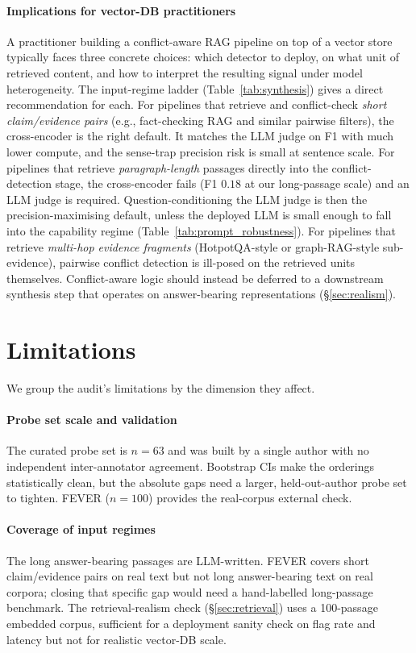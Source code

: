 \documentclass[sigconf, nonacm, natbib]{acmart}
\begin{document}
\paragraph{Implications for vector-DB practitioners}
A practitioner building a conflict-aware RAG pipeline on top of a vector store typically
faces three concrete choices: which detector to deploy, on what unit of retrieved
content, and how to interpret the resulting signal under model heterogeneity. The
input-regime ladder (Table~\ref{tab:synthesis}) gives a direct recommendation for each.
For pipelines that retrieve and conflict-check \emph{short claim/evidence pairs} (e.g.,
fact-checking RAG and similar pairwise filters), the cross-encoder is the right
default. It matches the LLM judge on F1 with much lower compute, and the sense-trap
precision risk is small at sentence scale. For pipelines that retrieve
\emph{paragraph-length} passages directly into the conflict-detection stage, the
cross-encoder fails (F1 $0.18$ at our long-passage scale) and an LLM judge is required.
Question-conditioning the LLM judge is then the precision-maximising default, unless
the deployed LLM is small enough to fall into the capability regime
(Table~\ref{tab:prompt_robustness}). For pipelines that retrieve \emph{multi-hop
evidence fragments} (HotpotQA-style or graph-RAG-style sub-evidence), pairwise conflict
detection is ill-posed on the retrieved units themselves. Conflict-aware logic should
instead be deferred to a downstream synthesis step that operates on answer-bearing
representations (\S\ref{sec:realism}).

\section{Limitations}
\label{sec:limitations}
We group the audit's limitations by the dimension they affect.

\paragraph{Probe set scale and validation}
The curated probe set is $n{=}63$ and was built by a single author with no independent
inter-annotator agreement. Bootstrap CIs make the orderings statistically clean, but
the absolute gaps need a larger, held-out-author probe set to tighten. FEVER
($n{=}100$) provides the real-corpus external check.

\paragraph{Coverage of input regimes}
The long answer-bearing passages are LLM-written. FEVER covers short claim/evidence
pairs on real text but not long answer-bearing text on real corpora; closing that
specific gap would need a hand-labelled long-passage benchmark. The retrieval-realism
check (\S\ref{sec:retrieval}) uses a 100-passage embedded corpus, sufficient for a
deployment sanity check on flag rate and latency but not for realistic vector-DB scale.
\end{document}
